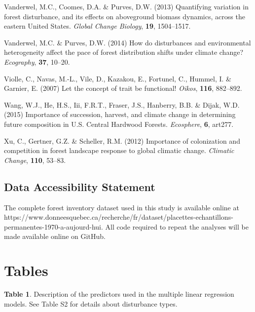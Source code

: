 \documentclass[a4paperpaper,]{article}
\begin{document}
\leavevmode\hypertarget{ref-vanderwel_quantifying_2013}{}%
Vanderwel, M.C., Coomes, D.A. \& Purves, D.W. (2013) Quantifying
variation in forest disturbance, and its effects on aboveground biomass
dynamics, across the eastern United States. \emph{Global Change
Biology}, \textbf{19}, 1504--1517.

\leavevmode\hypertarget{ref-vanderwel_how_2014}{}%
Vanderwel, M.C. \& Purves, D.W. (2014) How do disturbances and
environmental heterogeneity affect the pace of forest distribution
shifts under climate change? \emph{Ecography}, \textbf{37}, 10--20.

\leavevmode\hypertarget{ref-violle_let_2007}{}%
Violle, C., Navas, M.-L., Vile, D., Kazakou, E., Fortunel, C., Hummel,
I. \& Garnier, E. (2007) Let the concept of trait be functional!
\emph{Oikos}, \textbf{116}, 882--892.

\leavevmode\hypertarget{ref-wang_importance_2015}{}%
Wang, W.J., He, H.S., Iii, F.R.T., Fraser, J.S., Hanberry, B.B. \&
Dijak, W.D. (2015) Importance of succession, harvest, and climate change
in determining future composition in U.S. Central Hardwood Forests.
\emph{Ecosphere}, \textbf{6}, art277.

\leavevmode\hypertarget{ref-xu_importance_2012}{}%
Xu, C., Gertner, G.Z. \& Scheller, R.M. (2012) Importance of
colonization and competition in forest landscape response to global
climatic change. \emph{Climatic Change}, \textbf{110}, 53--83.

\pagebreak

\hypertarget{data-accessibility-statement}{%
\subsection{Data Accessibility
Statement}\label{data-accessibility-statement}}

The complete forest inventory dataset used in this study is available
online at
https://www.donneesquebec.ca/recherche/fr/dataset/placettes-echantillons-permanentes-1970-a-aujourd-hui.
All code required to repeat the analyses will be made available online
on GitHub.

\pagebreak

\hypertarget{tables}{%
\section{Tables}\label{tables}}

\textbf{Table 1}. Description of the predictors used in the multiple
linear regression models. See Table S2 for details about disturbance
types.
\end{document}
